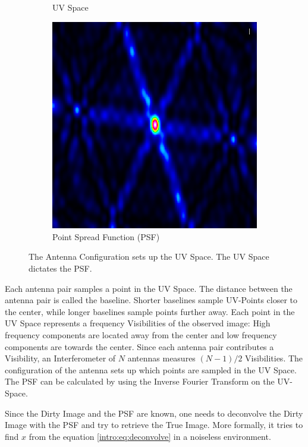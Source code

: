 \begin{figure}[h!]
\begin{subfigure}[b]{0.3\linewidth}
		\caption{UV Space}
	\end{subfigure}
	\begin{subfigure}[b]{0.3\linewidth}
	\includegraphics[width=\linewidth]{./chapters/01.intro/img/PSF.png}
	\caption{Point Spread Function (PSF)}
	\end{subfigure}
	\caption{The Antenna Configuration sets up the UV Space. The UV Space dictates the PSF.}
	\label{intro:ANT_UV_PSF}
\end{figure}

Each antenna pair samples a point in the UV Space. The distance between the antenna pair is called the baseline. Shorter baselines sample UV-Points closer to the center, while longer baselines sample points further away.  Each point in the UV Space represents a frequency Visibilities of the observed image: High frequency components are located away from the center and low frequency components are towards the center. Since each antenna pair contributes a Visibility, an Interferometer of $N$ antennas measures $(N-1)/2$ Visibilities. The configuration of the antenna sets up which points are sampled in the UV Space. The PSF can be calculated by using the Inverse Fourier Transform on the UV-Space.

Since the Dirty Image and the PSF are known, one needs to deconvolve the Dirty Image with the PSF and try to retrieve the True Image. More formally, it tries to find $x$ from the equation \eqref{intro:eq:deconvolve} in a noiseless environment.

